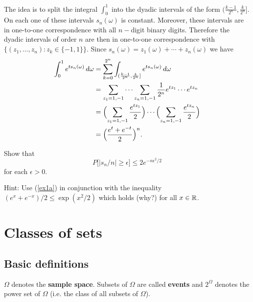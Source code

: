 \begin{exerciseproof}
The idea is to split the integral $\int_0^1$ into the dyadic intervals of the form $(\frac{k-1}{2^n},\frac{k}{2^n} ]$. On each one of these intervals $s_n(\omega)$ is constant. Moreover, these intervals are in one-to-one correspondence with all $n-$digit binary digits. Therefore the dyadic intervals of order $n$ are then in one-to-one correspondence with $\{(z_1,\ldots, z_n)\colon z_k\in\{ -1,1\} \}$. Since $s_n(\omega) = z_1(\omega)+\cdots+ z_n(\omega) $ we have
\begin{align*}
\int_0^1 e^{ts_n(\omega)}\,d\omega
& = \sum_{k=0}^{2^n}\int_{(\frac{k-1}{2^n},\frac{k}{2^n} ]} e^{ts_n(\omega)}\,d\omega \\
& = \sum_{z_1=1,-1}\cdots  \sum_{z_n=1,-1}\frac{1}{2^n} e^{tz_1} \cdots e^{tz_n} \\
& = \Bigl(\sum_{z_1=1,-1}\frac{e^{tz_1}}{2}\Bigr)\cdots  \Bigl(\sum_{z_n=1,-1}\frac{e^{tz_n}}{2}\Bigr)\\
& = \Bigl(\frac{e^t+e^{-t}}{2} \Bigr)^n .
\end{align*}
\end{exerciseproof}



\begin{exercise}
\label{exp ineq for sn}
 Show that
\[P\bigl[|s_n/n|\geq \epsilon\bigr]\leq 2 e^{-n\epsilon^2/2}  \]
for each $\epsilon>0$.

 Hint: %
 Use (\ref{ex1a}) in conjunction with the inequality $(e^x + e^{-x})/2\leq \exp(x^2/2)$ which holds (why?) for all $x\in\Bbb R$.
\end{exercise}


\clearpage
\section{Classes of sets}

\subsection{Basic definitions}

\begin{definition}
$\Omega$ denotes the {\bf sample space}. Subsets of $\Omega$ are called {\bf events} and $2^\Omega$ denotes the power set of $\Omega$ (i.e. the class of all subsets of $\Omega$).
\end{definition}


